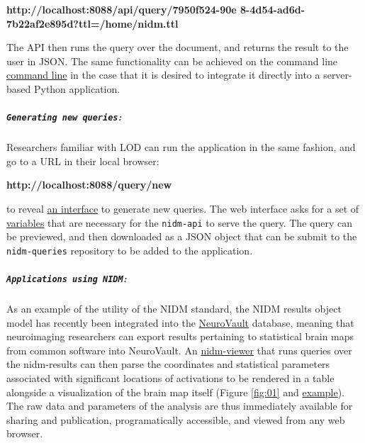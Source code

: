 \documentclass[twocolumn]{bmcart}%
\begin{document}
\textbf{http://localhost:8088/api/query/7950f524-90e 8-4d54-ad6d-7b22af2e895d?ttl=/home/nidm.ttl}\newline

The API then runs the query over the document, and returns the result to the user in JSON. The same functionality can be achieved on the command line \href{http://nidm-api.readthedocs.org/en/latest/getting-started.html#integration-into-python}{command line} in the case that it is desired to integrate it directly into a server-based Python application.\newline

\subparagraph{\texorpdfstring{\texttt{Generating new queries}:}{:}}\label{section}
Researchers familiar with LOD can run the application in the same fashion, and go to a URL in their local browser:\newline

\textbf{http://localhost:8088/query/new}\newline

to reveal \href{http://nidm-api.readthedocs.org/en/latest/development.html#web-query-generator}{an interface} to generate new queries. The web interface asks for a set of \href{http://nidm-api.readthedocs.org/en/latest/development.html#fields}{variables} that are necessary for the \texttt{nidm-api} to serve the query. The query can be previewed, and then downloaded as a JSON object that can be submit to the \texttt{nidm-queries} repository to be added to the application.\newline

\subparagraph{\texorpdfstring{\texttt{Applications using NIDM}:}{:}}\label{section}
As an example of the utility of the NIDM standard, the NIDM results object model \cite{noauthor_undated-if} has recently been integrated into the \href{http://www.neurovault.org}{NeuroVault} database, meaning that neuroimaging researchers can export results pertaining to statistical brain maps from common software \cite{Jenkinson2012-pr} into NeuroVault. An \href{https://github.com/vsoch/nidmviewer}{nidm-viewer} that runs queries over the nidm-results can then parse the coordinates and statistical parameters associated with significant locations of activations to be rendered in a table alongside a visualization of the brain map itself (Figure \ref{fig:01} and \href{http://neurovault.org/collections/877/fsl_course_av.nidm}{example}). The raw data and parameters of the analysis are thus immediately available for sharing and publication, programatically accessible, and viewed from any web browser. 
\end{document}
